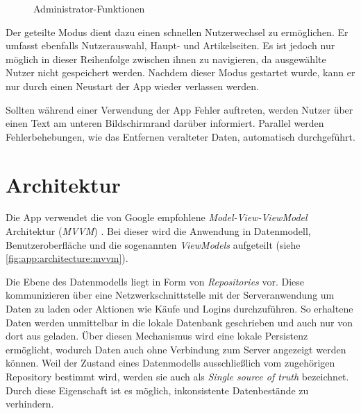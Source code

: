 \begin{figure}
	\qquad
	\caption{Administrator-Funktionen}%
	\label{fig:app:functionality:admin}%
\end{figure}

Der geteilte Modus dient dazu einen schnellen Nutzerwechsel zu ermöglichen.
Er umfasst ebenfalls Nutzerauswahl, Haupt- und Artikelseiten.
Es ist jedoch nur möglich in dieser Reihenfolge zwischen ihnen zu navigieren, da ausgewählte Nutzer nicht gespeichert werden.
Nachdem dieser Modus gestartet wurde, kann er nur durch einen Neustart der App wieder verlassen werden.

Sollten während einer Verwendung der App Fehler auftreten, werden Nutzer über einen Text am unteren Bildschirmrand darüber informiert.
Parallel werden Fehlerbehebungen, wie das Entfernen veralteter Daten, automatisch durchgeführt.

\section{Architektur}
\label{sec:app:architecture}
Die App verwendet die von Google empfohlene \textit{Model-View-ViewModel} Architektur (\textit{MVVM}) \autocite{androidarchitecture}.
Bei dieser wird die Anwendung in Datenmodell, Benutzeroberfläche und die sogenannten \textit{ViewModels} aufgeteilt (siehe \autoref{fig:app:architecture:mvvm}).

Die Ebene des Datenmodells liegt in Form von \textit{Repositories} vor.
Diese kommunizieren über eine Netzwerkschnittstelle mit der Serveranwendung um Daten zu laden oder Aktionen wie Käufe und Logins durchzuführen.
So erhaltene Daten werden unmittelbar in die lokale Datenbank geschrieben und auch nur von dort aus geladen.
Über diesen Mechanismus wird eine lokale Persistenz ermöglicht, wodurch Daten auch ohne Verbindung zum Server angezeigt werden können.
Weil der Zustand eines Datenmodells ausschließlich vom zugehörigen Repository bestimmt wird, werden sie auch als \textit{Single source of truth} bezeichnet.
Durch diese Eigenschaft ist es möglich, inkonsistente Datenbestände zu verhindern.

